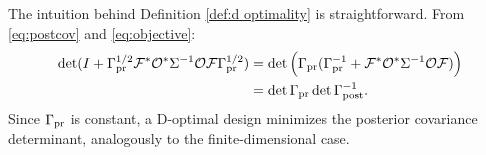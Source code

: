 \noindent The intuition behind Definition \ref{def:d optimality} is
straightforward. From \eqref{eq:postcov} and \eqref{eq:objective}:
\begin{align*}
  \begin{split}
    \det ( I + \prcov^{1/2}  \fwd ^* \obs^* \Sigma^{-1} \obs \fwd \prcov^{1/2}) &= \det \Big( \prcov ( \prcov^{-1} + \fwd ^* \obs^* \Sigma^{-1} \obs \fwd) \Big )\\
    &= \det \prcov \det \postcov^{-1}.
  \end{split}
\end{align*}
Since $\Gamma_{\textup{pr}}$ is constant, a D-optimal design minimizes the posterior
covariance determinant, analogously to the finite-dimensional case.




